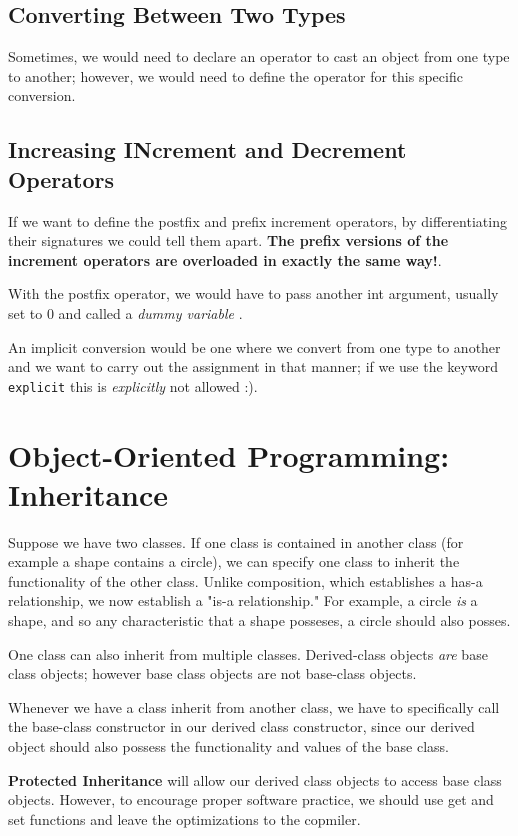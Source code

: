 \documentclass{article}
\begin{document}
\subsection{Converting Between Two Types}
Sometimes, we would need to declare an operator to cast an object from one type to another; however, we
would need to define the operator for this specific conversion. 
\subsection{Increasing INcrement and Decrement Operators}
If we want to define the postfix and prefix increment operators, by differentiating their signatures we could
tell them apart. \textbf{The prefix versions of the increment operators are overloaded in exactly the same way!}.

With the postfix operator, we would have to pass another int argument, usually set to 0 and called 
a \textit{dummy variable }.

An implicit conversion would be one where we convert from one type to another and we want to carry out the 
assignment in that manner; if we use the keyword \texttt{explicit} this is \textit{explicitly} not allowed :).
\newpage
\section{Object-Oriented Programming: Inheritance}
Suppose we have two classes. If one class is contained in another class (for example a shape contains a circle),
we can specify one class to inherit the functionality of the other class. Unlike composition, which establishes
a has-a relationship, we now establish a "is-a relationship." For example, a circle \textit{is} a shape, and 
so any characteristic that a shape posseses, a circle should also posses.

One class can also inherit from multiple classes. Derived-class objects \textit{are} base class objects; however
base class objects are not base-class objects.

Whenever we have a class inherit from another class, we have to specifically call the base-class constructor in
our  derived class constructor, since our derived object should also possess the functionality and values
of the base class.

\textbf{Protected Inheritance} will allow our derived class objects to access base class objects. However, 
to encourage proper software practice, we should use get and set functions and leave the optimizations to the 
copmiler.
\newpage
\end{document}
